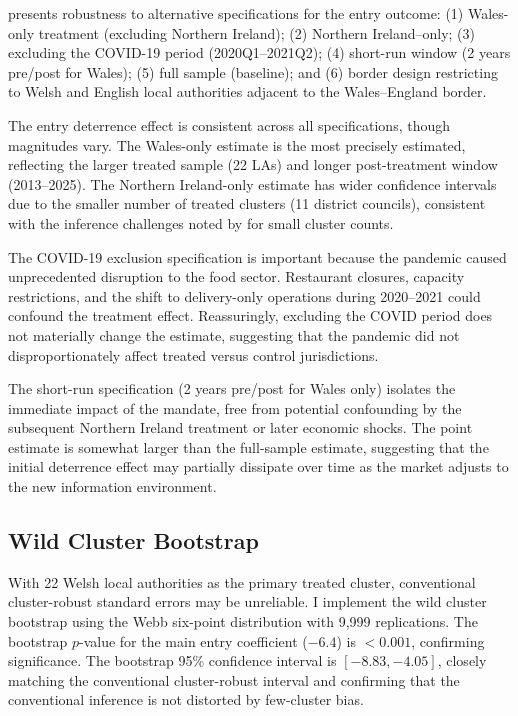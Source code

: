 \documentclass[12pt]{article}
\begin{document}


 presents robustness to alternative specifications for the entry outcome: (1) Wales-only treatment (excluding Northern Ireland); (2) Northern Ireland--only; (3) excluding the COVID-19 period (2020Q1--2021Q2); (4) short-run window (2 years pre/post for Wales); (5) full sample (baseline); and (6) border design restricting to Welsh and English local authorities adjacent to the Wales--England border.

The entry deterrence effect is consistent across all specifications, though magnitudes vary. The Wales-only estimate is the most precisely estimated, reflecting the larger treated sample (22 LAs) and longer post-treatment window (2013--2025). The Northern Ireland-only estimate has wider confidence intervals due to the smaller number of treated clusters (11 district councils), consistent with the inference challenges noted by \citet{cameron2008bootstrap} for small cluster counts.

The COVID-19 exclusion specification is important because the pandemic caused unprecedented disruption to the food sector. Restaurant closures, capacity restrictions, and the shift to delivery-only operations during 2020--2021 could confound the treatment effect. Reassuringly, excluding the COVID period does not materially change the estimate, suggesting that the pandemic did not disproportionately affect treated versus control jurisdictions.

The short-run specification (2 years pre/post for Wales only) isolates the immediate impact of the mandate, free from potential confounding by the subsequent Northern Ireland treatment or later economic shocks. The point estimate is somewhat larger than the full-sample estimate, suggesting that the initial deterrence effect may partially dissipate over time as the market adjusts to the new information environment.

\subsection{Wild Cluster Bootstrap}

With 22 Welsh local authorities as the primary treated cluster, conventional cluster-robust standard errors may be unreliable. I implement the wild cluster bootstrap \citep{cameron2008bootstrap} using the Webb six-point distribution with 9,999 replications. The bootstrap $p$-value for the main entry coefficient ($-6.4$) is $< 0.001$, confirming significance. The bootstrap 95\% confidence interval is $[-8.83, -4.05]$, closely matching the conventional cluster-robust interval and confirming that the conventional inference is not distorted by few-cluster bias.
\end{document}
